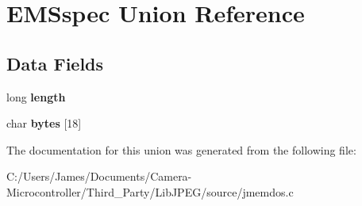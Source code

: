 \hypertarget{union_e_m_sspec}{}\section{E\+M\+Sspec Union Reference}
\label{union_e_m_sspec}
\subsection*{Data Fields}
\begin{DoxyCompactItemize}
\item 
\mbox{\label{union_e_m_sspec_ae2b29049fcd8b777a54a1529743b2390}} 
long {\bfseries length}
\item 
\mbox{\label{union_e_m_sspec_a020c98a8f2cfc72ac947f269efc506e8}} 
char {\bfseries bytes} \mbox{[}18\mbox{]}
\end{DoxyCompactItemize}


The documentation for this union was generated from the following file\+:\begin{DoxyCompactItemize}
\item 
C\+:/\+Users/\+James/\+Documents/\+Camera-\/\+Microcontroller/\+Third\+\_\+\+Party/\+Lib\+J\+P\+E\+G/source/jmemdos.\+c\end{DoxyCompactItemize}
